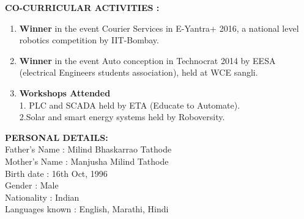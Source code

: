 \documentclass[12pt]{article}
\begin{document}
\begin{flushleft}
\begin{flushleft}
\begin{flushleft}
\begin{itemize}
\end{itemize}
\end{flushleft}
\textbf{CO-CURRICULAR ACTIVITIES : }
\begin{enumerate}
\item \textbf{Winner} in the event Courier Services in E-Yantra+ 2016, a national level robotics competition by IIT-Bombay.
\item \textbf{Winner} in the event Auto conception in Technocrat 2014 by EESA (electrical Engineers students association), held at WCE sangli.
\item \textbf{Workshops Attended}\\ 1. PLC and SCADA held by ETA (Educate to Automate).\\
2.Solar and smart energy systems held by Roboversity.
\end{enumerate}
\textbf{PERSONAL DETAILS:}\\
\vspace{2ex}
Father's Name : Milind Bhaskarrao Tathode\\
Mother's Name : Manjusha Milind Tathode\\
Birth date : 16th Oct, 1996\\
Gender : Male\\
Nationality : Indian\\
Languages known : English, Marathi, Hindi\\
\end{document}
